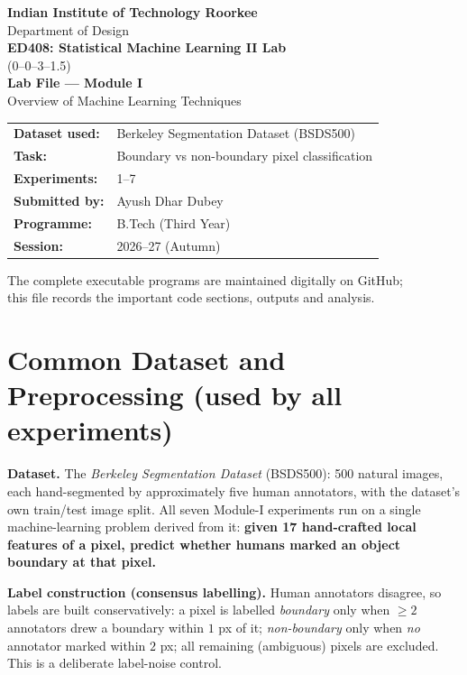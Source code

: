 \documentclass[11pt,a4paper]{article}
\begin{document}
\begin{titlepage}
\centering
\vspace*{1.5cm}
{\Large \textbf{Indian Institute of Technology Roorkee}}\\[0.6cm]
{\large Department of Design}\\[2.2cm]
{\LARGE \textbf{ED408: Statistical Machine Learning II Lab}}\\[0.4cm]
{\large (0--0--3--1.5)}\\[1.2cm]
{\Large \textbf{Lab File --- Module I}}\\[0.3cm]
{\large Overview of Machine Learning Techniques}\\[2.0cm]
\begin{tabular}{ll}
\textbf{Dataset used:} & Berkeley Segmentation Dataset (BSDS500)\\[2pt]
\textbf{Task:}         & Boundary vs non-boundary pixel classification\\[2pt]
\textbf{Experiments:}  & 1--7 \\[2pt]
\textbf{Submitted by:} & Ayush Dhar Dubey \\[2pt]
\textbf{Programme:}    & B.Tech (Third Year) \\[2pt]
\textbf{Session:}      & 2026--27 (Autumn)\\
\end{tabular}
\vfill
{\small The complete executable programs are maintained digitally on GitHub;\\
this file records the important code sections, outputs and analysis.}
\end{titlepage}

\section*{Common Dataset and Preprocessing (used by all experiments)}
\textbf{Dataset.} The \emph{Berkeley Segmentation Dataset} (BSDS500): 500 natural images, each hand-segmented by approximately five human annotators, with the dataset's own train/test image split. All seven Module-I experiments run on a single machine-learning problem derived from it: \textbf{given 17 hand-crafted local features of a pixel, predict whether humans marked an object boundary at that pixel.}

\textbf{Label construction (consensus labelling).} Human annotators disagree, so labels are built conservatively: a pixel is labelled \emph{boundary} only when $\geq 2$ annotators drew a boundary within $1$ px of it; \emph{non-boundary} only when \emph{no} annotator marked within $2$ px; all remaining (ambiguous) pixels are excluded. This is a deliberate label-noise control.
\end{document}
